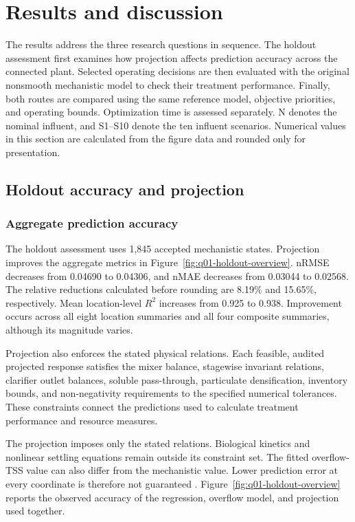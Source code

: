 \documentclass[a4paper,fleqn]{cas-sc}
\begin{document}
\section{Results and discussion}
\label{sec:results}

The results address the three research questions in sequence. The holdout assessment first examines how projection affects prediction accuracy across the connected plant. Selected operating decisions are then evaluated with the original nonsmooth mechanistic model to check their treatment performance. Finally, both routes are compared using the same reference model, objective priorities, and operating bounds. Optimization time is assessed separately. N denotes the nominal influent, and S1--S10 denote the ten influent scenarios. Numerical values in this section are calculated from the figure data and rounded only for presentation.

\subsection{Holdout accuracy and projection}
\label{sec:results-holdout}

\subsubsection{Aggregate prediction accuracy}
\label{sec:results-holdout-overview}

The holdout assessment uses 1,845 accepted mechanistic states. Projection improves the aggregate metrics in Figure~\ref{fig:q01-holdout-overview}. nRMSE decreases from 0.04690 to 0.04306, and nMAE decreases from 0.03044 to 0.02568. The relative reductions calculated before rounding are 8.19\% and 15.65\%, respectively. Mean location-level $R^2$ increases from 0.925 to 0.938. Improvement occurs across all eight location summaries and all four composite summaries, although its magnitude varies.

Projection also enforces the stated physical relations. Each feasible, audited projected response satisfies the mixer balance, stagewise invariant relations, clarifier outlet balances, soluble pass-through, particulate densification, inventory bounds, and non-negativity requirements to the specified numerical tolerances. These constraints connect the predictions used to calculate treatment performance and resource measures.

The projection imposes only the stated relations. Biological kinetics and nonlinear settling equations remain outside its constraint set. The fitted overflow-TSS value can also differ from the mechanistic value. Lower prediction error at every coordinate is therefore not guaranteed \citep{Selerio2026,SturmSilva2025}. Figure~\ref{fig:q01-holdout-overview} reports the observed accuracy of the regression, overflow model, and projection used together.
\end{document}
